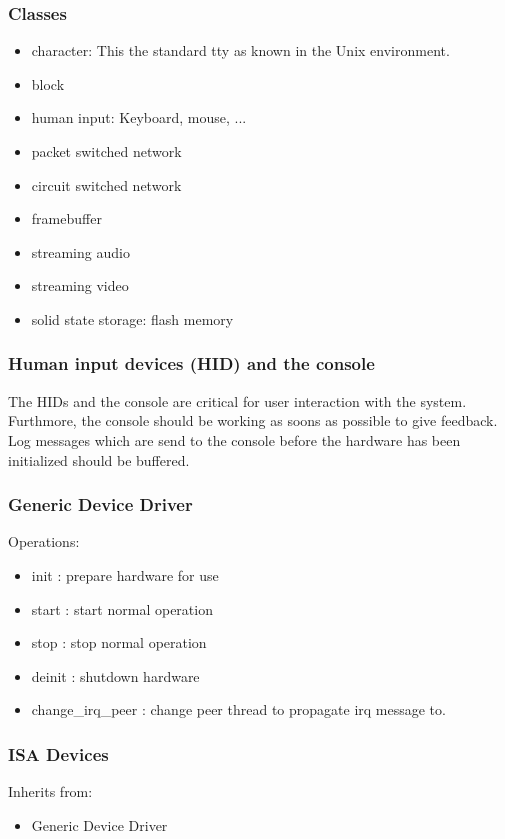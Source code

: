 \documentclass[9pt,a4paper]{extarticle}
\begin{document}
\subsubsection{Classes}
\begin{itemize}
\item character: This the standard tty as known in the Unix environment.
\item block
\item human input: Keyboard, mouse, ...
\item packet switched network
\item circuit switched network
\item framebuffer
\item streaming audio
\item streaming video
\item solid state storage: flash memory
\end{itemize}

\subsubsection{Human input devices (HID) and the console}

The HIDs and the console are critical for user interaction with the
system.  Furthmore, the console should be working as soons as possible
to give feedback.  Log messages which are send to the console before
the hardware has been initialized should be buffered.

\subsubsection{Generic Device Driver}
Operations:
\begin{itemize}
\item init : prepare hardware for use
\item start : start normal operation
\item stop : stop normal operation
\item deinit : shutdown hardware
\item change\_irq\_peer : change peer thread to propagate irq message to.
\end{itemize}


\subsubsection{ISA Devices}
Inherits from:
\begin{itemize}
\item Generic Device Driver
\end{itemize}
\end{document}
